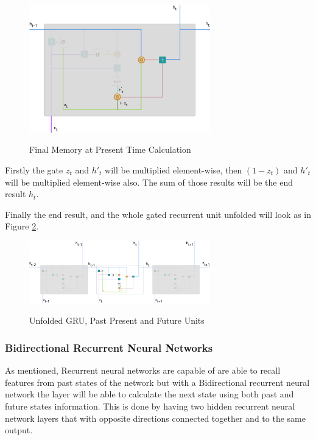 \begin{figure}[htp]
	\centering
	\includegraphics[width=0.7\textwidth]{Illustrations/GRUlaststep.png}
	\caption{Final Memory at Present Time Calculation}\cite{GRUPHOTOS}
	\label{fig:GRUlaststep}
\end{figure}


Firstly the gate $z_t$ and $h'_t$ will be multiplied element-wise, then $(1-z_t)$ and $h'_t$ will be multiplied element-wise also. The sum of those results will be the end result $h_t$. 

Finally the end result, and the whole gated recurrent unit unfolded will look as in Figure \ref{fig:GRUunfolded}.

\begin{figure}[htp]
	\centering
	\includegraphics[width=0.7\textwidth]{Illustrations/GRUunfolded.png}
	\caption{Unfolded GRU, Past Present and Future Units}\cite{GRUPHOTOS}
	\label{fig:GRUunfolded}
\end{figure}

\newpage
\subsubsection{Bidirectional Recurrent Neural Networks} 
As mentioned, Recurrent neural networks are capable of are able to recall features from past states of the network but with a Bidirectional recurrent neural network the layer will be able to calculate the next state using both past and future states information. This is done by having two hidden recurrent neural network layers that with opposite directions connected together and to the same output. 

